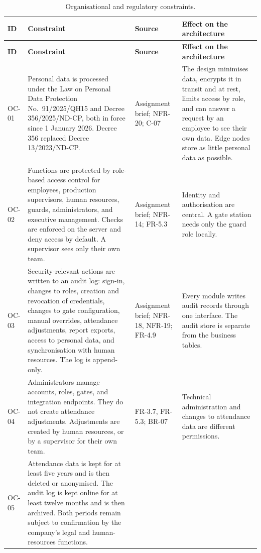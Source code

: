 \begin{longtable}{@{}L{1.25cm}L{5.15cm}L{4.05cm}L{4.15cm}@{}}
\caption{Organisational and regulatory constraints.}
\label{tab:oc}\\
\toprule
\textbf{ID} & \textbf{Constraint} & \textbf{Source} & \textbf{Effect on the architecture}\\
\midrule
\endfirsthead
\toprule
\textbf{ID} & \textbf{Constraint} & \textbf{Source} & \textbf{Effect on the architecture}\\
\midrule
\endhead
OC-01 &
Personal data is processed under the Law on Personal Data Protection No.~91/2025/QH15 and Decree 356/2025/ND-CP, both in force since 1 January 2026.
Decree 356 replaced Decree 13/2023/ND-CP. &
Assignment brief; NFR-20; C-07 &
The design minimises data, encrypts it in transit and at rest, limits access by role, and can answer a request by an employee to see their own data.
Edge nodes store as little personal data as possible.\\
\addlinespace
OC-02 &
Functions are protected by role-based access control for employees, production supervisors, human resources, guards, administrators, and executive management.
Checks are enforced on the server and deny access by default.
A supervisor sees only their own team. &
Assignment brief; NFR-14; FR-5.3 &
Identity and authorisation are central.
A gate station needs only the guard role locally.\\
\addlinespace
OC-03 &
Security-relevant actions are written to an audit log: sign-in, changes to roles, creation and revocation of credentials, changes to gate configuration, manual overrides, attendance adjustments, report exports, access to personal data, and synchronisation with human resources.
The log is append-only. &
Assignment brief; NFR-18, NFR-19; FR-4.9 &
Every module writes audit records through one interface.
The audit store is separate from the business tables.\\
\addlinespace
OC-04 &
Administrators manage accounts, roles, gates, and integration endpoints.
They do not create attendance adjustments.
Adjustments are created by human resources, or by a supervisor for their own team. &
FR-3.7, FR-5.3; BR-07 &
Technical administration and changes to attendance data are different permissions.\\
\addlinespace
OC-05 &
Attendance data is kept for at least five years and is then deleted or anonymised.
The audit log is kept online for at least twelve months and is then archived.
Both periods remain subject to confirmation by the company's legal and human-resources functions. &

\end{longtable}
